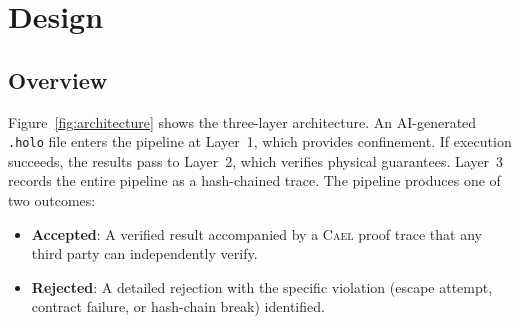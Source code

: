 \documentclass[letterpaper,twocolumn,10pt]{article}
\newcommand{\cael}{\textsc{Cael}}
\begin{document}

\section{Design}
\label{sec:design}

\subsection{Overview}

Figure~\ref{fig:architecture} shows the three-layer architecture. An
AI-generated \texttt{.holo} file enters the pipeline at Layer~1, which
provides confinement. If execution succeeds, the results pass to Layer~2,
which verifies physical guarantees. Layer~3 records the entire pipeline
as a hash-chained trace. The pipeline produces one of two outcomes:

\begin{itemize}[leftmargin=*,topsep=2pt,itemsep=1pt]
  \item \textbf{Accepted}: A verified result accompanied by a \cael{} proof
    trace that any third party can independently verify.
  \item \textbf{Rejected}: A detailed rejection with the specific violation
    (escape attempt, contract failure, or hash-chain break) identified.
\end{itemize}
\end{document}
